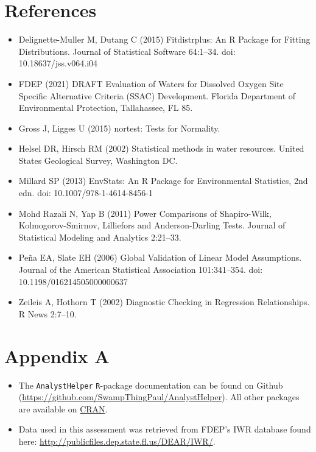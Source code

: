 \documentclass[]{interact}
\theoremstyle{plain}%
\theoremstyle{definition}
\theoremstyle{remark}
\begin{document}
\hypertarget{references}{%
\section{References}\label{references}}

\begin{itemize}
\item
  Delignette-Muller M, Dutang C (2015) Fitdistrplus: An R Package for
  Fitting Distributions. Journal of Statistical Software 64:1--34. doi:
  10.18637/jss.v064.i04
\item
  FDEP (2021) DRAFT Evaluation of Waters for Dissolved Oxygen Site
  Specific Alternative Criteria (SSAC) Development. Florida Department
  of Environmental Protection, Tallahassee, FL 85.
\item
  Gross J, Ligges U (2015) nortest: Tests for Normality.
\item
  Helsel DR, Hirsch RM (2002) Statistical methods in water resources.
  United States Geological Survey, Washington DC.
\item
  Millard SP (2013) EnvStats: An R Package for Environmental Statistics,
  2nd edn. doi: 10.1007/978-1-4614-8456-1
\item
  Mohd Razali N, Yap B (2011) Power Comparisons of Shapiro-Wilk,
  Kolmogorov-Smirnov, Lilliefors and Anderson-Darling Tests. Journal of
  Statistical Modeling and Analytics 2:21--33.
\item
  Peña EA, Slate EH (2006) Global Validation of Linear Model
  Assumptions. Journal of the American Statistical Association
  101:341--354. doi: 10.1198/016214505000000637
\item
  Zeileis A, Hothorn T (2002) Diagnostic Checking in Regression
  Relationships. R News 2:7--10.
\end{itemize}

\newpage

\hypertarget{appendix-a}{%
\section{Appendix A}\label{appendix-a}}

\begin{itemize}
\item
  The \texttt{AnalystHelper} \texttt{R}-package documentation can be
  found on Github
  (\url{https://github.com/SwampThingPaul/AnalystHelper}). All other
  packages are available on \href{https://cran.r-project.org/}{CRAN}.
\item
  Data used in this assessment was retrieved from FDEP's IWR database
  found here: \url{http://publicfiles.dep.state.fl.us/DEAR/IWR/}.
\end{itemize}
\end{document}
